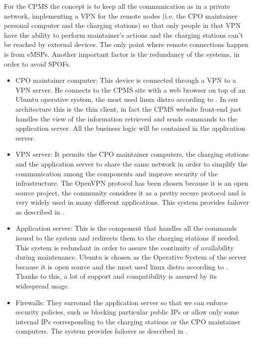 For the \ac{CPMS} the concept is to keep all the communication as in a private network, implementing a \ac{VPN} for the remote nodes (i.e. the \ac{CPO} maintainer personal computer and the charging stations) so that only people in that \ac{VPN} have the ability to perform maintainer's actions and the charging stations can't be reached by external devices. The only point where remote connections happen is from \acp{eMSP}.
Another important factor is the redundancy of the systems, in order to avoid \acp{SPOF}.
\begin{itemize}
    \item \ac{CPO} maintainer computer: This device is connected through a \ac{VPN} to a \ac{VPN} server. He connects to the \ac{CPMS} site with a web browser on top of an Ubuntu operative system, the most used linux distro according to \cite{ref:most-popular-linux-distro}.
          In our architecture this is the thin client, in fact the \ac{CPMS} website front-end just handles the view of the information retrieved and sends commands to the application server. All the business logic will be contained in the application server.
    \item \ac{VPN} server: It permits the \ac{CPO} maintainer computers, the charging stations and the application server to share the same network in order to simplify the communication among the components and improve security of the infrastructure.
          The OpenVPN protocol \cite{ref:openvpn-site} has been chosen because it is an open source project, the community considers it as a pretty secure protocol and is very widely used in many different applications.
          This system provides failover as described in \cite{ref:redundant-VPN-servers}.
    \item Application server: This is the component that handles all the commands issued to the system and redirects them to the charging stations if needed. This system is redundant in order to assure the continuity of availability during maintenance.
          Ubuntu is chosen as the Operative System of the server because it is open source and the most used linux distro according to \cite{ref:most-popular-linux-distro}. Thanks to this, a lot of support and compatibility is assured by its widespread usage.
    \item Firewalls: They surround the application server so that we can enforce security policies, such as blocking particular public IPs or allow only some internal IPs corresponding to the charging stations or the \ac{CPO} maintainer computers. The system provides failover as described in \cite{ref:redundant-firewalls}.
\end{itemize}
\clearpage

